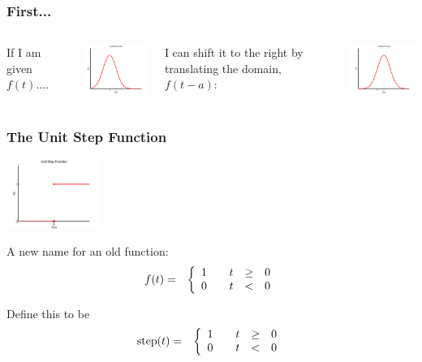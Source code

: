 \begin{frame}
  \frametitle{First...}


  \begin{columns}
  
    If I am given $f(t)$....\\
    \centerline{\includegraphics[width=4cm]{img/unshifted}}

    {%

      I can shift it to the right by translating the domain, $f(t-a)$:\\
      \centerline{\includegraphics[width=4cm]{img/shifted}}

    }

  \end{columns}
  

\end{frame}

\begin{frame}
  \frametitle{The Unit Step Function}

  \centerline{\includegraphics[width=3cm]{img/unitStepFunction}}

  A new name for an old function:
  \begin{eqnarray*}
    f(t) & = & 
    \left\{
      \begin{array}{r@{\hspace{2em}}rcl}
        1 & t & \geq & 0 \\
        0 & t & < & 0
      \end{array}
    \right.
  \end{eqnarray*}

  {
    Define this to be
    \begin{eqnarray*}
      \mathrm{step}(t) & = & 
      \left\{
        \begin{array}{r@{\hspace{2em}}rcl}
          1 & t & \geq & 0 \\
          0 & t & < & 0
        \end{array}
      \right.
    \end{eqnarray*}
  }

\end{frame}


